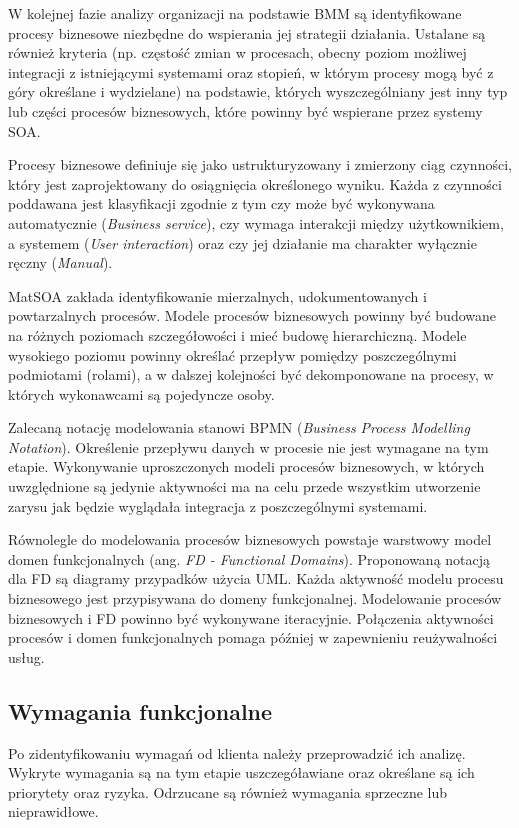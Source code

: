 W kolejnej fazie analizy organizacji na podstawie BMM są identyfikowane procesy biznesowe niezbędne do wspierania jej strategii działania. Ustalane są również kryteria (np. częstość zmian w procesach, obecny poziom możliwej integracji z istniejącymi systemami oraz stopień, w którym procesy mogą być z góry określane i wydzielane) na podstawie, których wyszczególniany jest inny typ lub części procesów biznesowych, które powinny być wspierane przez systemy SOA.

Procesy biznesowe definiuje się jako ustrukturyzowany i zmierzony ciąg czynności, który jest zaprojektowany do osiągnięcia określonego wyniku\cite{PlatIntGor}. Każda z czynności poddawana jest klasyfikacji zgodnie z tym czy może być wykonywana automatycznie (\emph{Business service}), czy wymaga interakcji między użytkownikiem, a systemem (\emph{User interaction}) oraz czy jej działanie ma charakter wyłącznie ręczny (\emph{Manual}).

MatSOA zakłada identyfikowanie mierzalnych, udokumentowanych i powtarzalnych procesów. Modele procesów biznesowych powinny być budowane na różnych poziomach szczegółowości i mieć budowę hierarchiczną. Modele wysokiego poziomu powinny określać przepływ pomiędzy poszczególnymi podmiotami (rolami), a w dalszej kolejności być dekomponowane na procesy, w których wykonawcami są pojedyncze osoby. 

Zalecaną notację modelowania stanowi BPMN (\emph{Business Process Modelling Notation}). Określenie przepływu danych w procesie nie jest wymagane na tym etapie. Wykonywanie uproszczonych modeli procesów biznesowych, w których uwzględnione są jedynie aktywności ma na celu przede wszystkim utworzenie zarysu jak będzie wyglądała integracja z poszczególnymi systemami.

Równolegle do modelowania procesów biznesowych powstaje warstwowy model domen funkcjonalnych (ang. \emph{FD - Functional Domains}). Proponowaną notacją dla FD są diagramy przypadków użycia UML. Każda aktywność modelu procesu biznesowego jest przypisywana do domeny funkcjonalnej. Modelowanie procesów biznesowych i FD powinno być wykonywane iteracyjnie. Połączenia aktywności procesów i domen funkcjonalnych pomaga później w zapewnieniu reużywalności usług.

\subsection*{Wymagania funkcjonalne}
Po zidentyfikowaniu wymagań od klienta należy przeprowadzić ich analizę. Wykryte wymagania są na tym etapie uszczegóławiane oraz określane są ich priorytety oraz ryzyka. Odrzucane są również wymagania sprzeczne lub nieprawidłowe.

